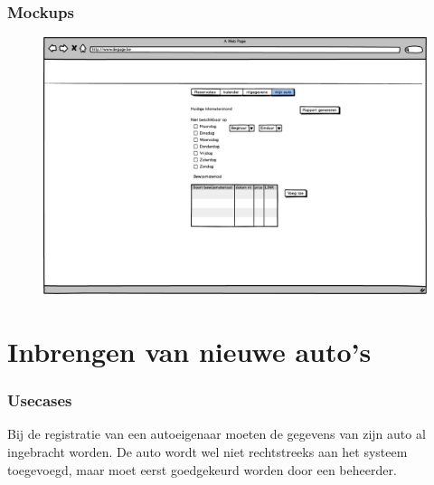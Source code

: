 \documentclass[11pt,a4paper,oneside]{article}
\begin{document}
\section{Mockups}
\begin{figure}[H]\includegraphics[width=\textwidth]{../../mockups/autobeheer_mijnauto.png}\end{figure}

\part{Inbrengen van nieuwe auto's}
\section{Usecases}
Bij de registratie van een autoeigenaar moeten de gegevens van zijn auto al ingebracht worden. De auto wordt wel niet rechtstreeks aan het
systeem toegevoegd, maar moet eerst goedgekeurd worden door een beheerder.
\end{document}
